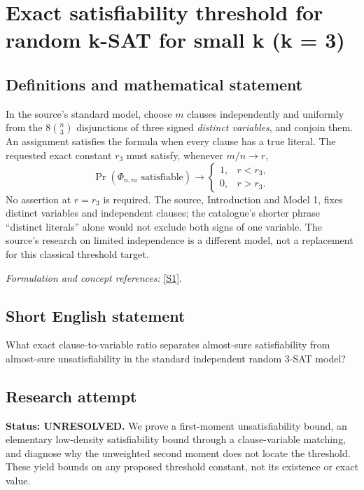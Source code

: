\documentclass[11pt]{article}
\begin{document}
\section*{\texorpdfstring{Exact satisfiability threshold for random k-SAT for small k (k = 3)}{Exact satisfiability threshold for random k-SAT for small k (k = 3)}}\label{30006808}
\subsection{Definitions and mathematical statement}
In the source's standard model, choose $m$ clauses independently and uniformly from the $8\binom n3$ disjunctions of three signed \emph{distinct variables}, and conjoin them. An assignment satisfies the formula when every clause has a true literal. The requested exact constant $r_3$ must satisfy, whenever $m/n\to r$,
\[
 \Pr(\Phi_{n,m}\text{ satisfiable})\to
 \begin{cases}1,&r<r_3,\\0,&r>r_3.\end{cases}
\]
No assertion at $r=r_3$ is required. The source, Introduction and Model 1, fixes distinct variables and independent clauses; the catalogue's shorter phrase ``distinct literals'' alone would not exclude both signs of one variable. The source's research on limited independence is a different model, not a replacement for this classical threshold target.
\par\smallskip\textit{Formulation and concept references:} \href{https://drops.dagstuhl.de/storage/00lipics/lipics-vol351-esa2025/LIPIcs.ESA.2025.103/LIPIcs.ESA.2025.103.pdf}{[S1]}.

\subsection{Short English statement}
What exact clause-to-variable ratio separates almost-sure satisfiability from almost-sure unsatisfiability in the standard independent random 3-SAT model?
\subsection{Research attempt}
\textbf{Status: UNRESOLVED.} We prove a first-moment unsatisfiability bound, an elementary low-density satisfiability bound through a clause-variable matching, and diagnose why the unweighted second moment does not locate the threshold. These yield bounds on any proposed threshold constant, not its existence or exact value.
\end{document}
